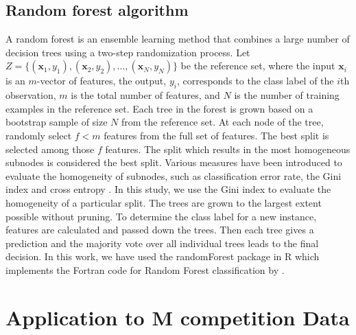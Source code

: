 \documentclass[11pt,a4paper,]{article}
\theoremstyle{definition}
\theoremstyle{definition}
\theoremstyle{definition}
\theoremstyle{remark}
\begin{document}
\subsection{Random forest algorithm}\label{random-forest-algorithm}

A random forest \autocite{breiman2001random} is an ensemble learning
method that combines a large number of decision trees using a two-step
randomization process. Let
\(Z=\{(\bm{x}_1, y_1), (\bm{x}_2, y_2), \dots, (\bm{x}_N, y_N)\}\) be
the reference set, where the input \(\bm{x}_i\) is an \(m\)-vector of
features, the output, \(y_i\), corresponds to the class label of the
\(i\)th observation, \(m\) is the total number of features, and \(N\) is
the number of training examples in the reference set. Each tree in the
forest is grown based on a bootstrap sample of size \(N\) from the
reference set. At each node of the tree, randomly select \(f<m\)
features from the full set of features. The best split is selected among
those \(f\) features. The split which results in the most homogeneous
subnodes is considered the best split. Various measures have been
introduced to evaluate the homogeneity of subnodes, such as
classification error rate, the Gini index and cross entropy
\autocite{friedman2001elements}. In this study, we use the Gini index to
evaluate the homogeneity of a particular split. The trees are grown to
the largest extent possible without pruning. To determine the class
label for a new instance, features are calculated and passed down the
trees. Then each tree gives a prediction and the majority vote over all
individual trees leads to the final decision. In this work, we have used
the randomForest package \autocite{liaw2002randomforest} in R
\autocite{Rcore} which implements the Fortran code for Random Forest
classification by \textcite{breiman2004random}.

\section{Application to M competition Data}\label{Mcomp}
\end{document}

